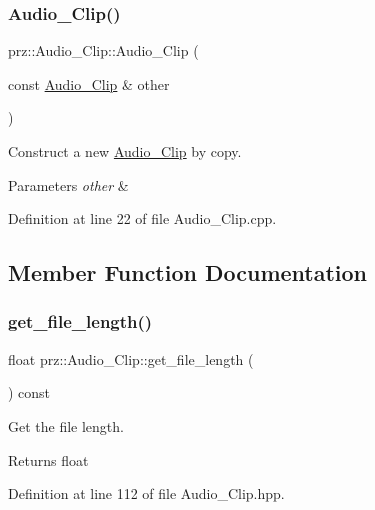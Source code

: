 \subsubsection{\texorpdfstring{Audio\_Clip()}{Audio\_Clip()}\hspace{0.1cm}{\footnotesize\ttfamily [2/2]}}
{\footnotesize\ttfamily prz\+::\+Audio\+\_\+\+Clip\+::\+Audio\+\_\+\+Clip (\begin{DoxyParamCaption}\item[{const \mbox{\hyperlink{classprz_1_1_audio___clip}{Audio\+\_\+\+Clip}} \&}]{other }\end{DoxyParamCaption})}



Construct a new \mbox{\hyperlink{classprz_1_1_audio___clip}{Audio\+\_\+\+Clip}} by copy. 


\begin{DoxyParams}{Parameters}
{\em other} & \\
\hline
\end{DoxyParams}


Definition at line 22 of file Audio\+\_\+\+Clip.\+cpp.



\subsection{Member Function Documentation}
\mbox{\label{classprz_1_1_audio___clip_aa64143bed59cae5e2809284ad5765b52}} 
\subsubsection{\texorpdfstring{get\_file\_length()}{get\_file\_length()}}
{\footnotesize\ttfamily float prz\+::\+Audio\+\_\+\+Clip\+::get\+\_\+file\+\_\+length (\begin{DoxyParamCaption}{ }\end{DoxyParamCaption}) const\hspace{0.3cm}{\ttfamily [inline]}}



Get the file length. 

\begin{DoxyReturn}{Returns}
float 
\end{DoxyReturn}


Definition at line 112 of file Audio\+\_\+\+Clip.\+hpp.

